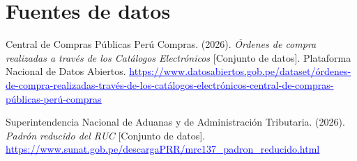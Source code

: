\documentclass[12pt,a4paper]{article}
\newcommand{\enlace}[2]{\href{#1}{\textcolor{blue}{#2}}}
\begin{document}
\section*{Fuentes de datos}
\vspace{-1.2cm}
\begin{thebibliography}{99}\small
{}
Central de Compras Públicas Perú Compras. (2026). \emph{Órdenes de compra realizadas a través de los
Catálogos Electrónicos} [Conjunto de datos]. Plataforma Nacional de Datos Abiertos.
\enlace{https://www.datosabiertos.gob.pe/dataset/órdenes-de-compra-realizadas-través-de-los-catálogos-electrónicos-central-de-compras-públicas-perú-compras}{\uline{https:/}\allowbreak \uline{/}\allowbreak \uline{www.}\allowbreak \uline{datosabiertos.}\allowbreak \uline{gob.}\allowbreak \uline{pe/}\allowbreak \uline{dataset/}\allowbreak \uline{órdenes-}\allowbreak \uline{de-}\allowbreak \uline{compra-}\allowbreak \uline{realizadas-}\allowbreak \uline{través-}\allowbreak \uline{de-}\allowbreak \uline{los-}\allowbreak \uline{catálogos-}\allowbreak \uline{electrónicos-}\allowbreak \uline{central-}\allowbreak \uline{de-}\allowbreak \uline{compras-}\allowbreak \uline{públicas-}\allowbreak \uline{perú-}\allowbreak \uline{compras}}

Superintendencia Nacional de Aduanas y de Administración Tributaria. (2026). \emph{Padrón reducido del
RUC} [Conjunto de datos]. \enlace{https://www.sunat.gob.pe/descargaPRR/mrc137_padron_reducido.html}{\uline{https:/}\allowbreak \uline{/}\allowbreak \uline{www.}\allowbreak \uline{sunat.}\allowbreak \uline{gob.}\allowbreak \uline{pe/}\allowbreak \uline{descargaPRR/}\allowbreak \uline{mrc137\_}\allowbreak \uline{padron\_}\allowbreak \uline{reducido.}\allowbreak \uline{html}}
\end{thebibliography}
\end{document}
